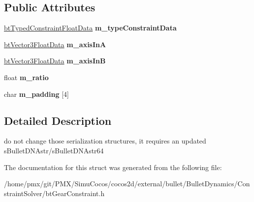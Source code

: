 \subsection*{Public Attributes}
\begin{DoxyCompactItemize}
\item 
\mbox{\label{structbtGearConstraintFloatData_a7491b3955f465f6fcb08b848ce19a978}} 
\hyperlink{structbtTypedConstraintFloatData}{bt\+Typed\+Constraint\+Float\+Data} {\bfseries m\+\_\+type\+Constraint\+Data}
\item 
\mbox{\label{structbtGearConstraintFloatData_acc2733b90a74a35cde262be6f4413c2f}} 
\hyperlink{structbtVector3FloatData}{bt\+Vector3\+Float\+Data} {\bfseries m\+\_\+axis\+InA}
\item 
\mbox{\label{structbtGearConstraintFloatData_a93c72df31cfec37292123bfbed2b412e}} 
\hyperlink{structbtVector3FloatData}{bt\+Vector3\+Float\+Data} {\bfseries m\+\_\+axis\+InB}
\item 
\mbox{\label{structbtGearConstraintFloatData_a9d9a8927435e2ae3f8342f98d514ece2}} 
float {\bfseries m\+\_\+ratio}
\item 
\mbox{\label{structbtGearConstraintFloatData_a420512ee210e36682790748fd1c88803}} 
char {\bfseries m\+\_\+padding} \mbox{[}4\mbox{]}
\end{DoxyCompactItemize}


\subsection{Detailed Description}
do not change those serialization structures, it requires an updated s\+Bullet\+D\+N\+Astr/s\+Bullet\+D\+N\+Astr64 

The documentation for this struct was generated from the following file\+:\begin{DoxyCompactItemize}
\item 
/home/pmx/git/\+P\+M\+X/\+Simu\+Cocos/cocos2d/external/bullet/\+Bullet\+Dynamics/\+Constraint\+Solver/bt\+Gear\+Constraint.\+h\end{DoxyCompactItemize}
